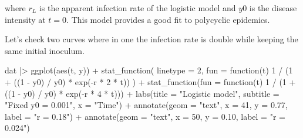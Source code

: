 \documentclass[
  letterpaper,
  DIV=11,
  numbers=noendperiod]{scrreprt}
\newenvironment{Shaded}{\begin{snugshade}}{\end{snugshade}}
\newcommand{\AttributeTok}[1]{\textcolor[rgb]{0.40,0.45,0.13}{#1}}
\newcommand{\ControlFlowTok}[1]{\textcolor[rgb]{0.00,0.23,0.31}{#1}}
\newcommand{\DecValTok}[1]{\textcolor[rgb]{0.68,0.00,0.00}{#1}}
\newcommand{\FloatTok}[1]{\textcolor[rgb]{0.68,0.00,0.00}{#1}}
\newcommand{\FunctionTok}[1]{\textcolor[rgb]{0.28,0.35,0.67}{#1}}
\newcommand{\NormalTok}[1]{\textcolor[rgb]{0.00,0.23,0.31}{#1}}
\newcommand{\SpecialCharTok}[1]{\textcolor[rgb]{0.37,0.37,0.37}{#1}}
\newcommand{\StringTok}[1]{\textcolor[rgb]{0.13,0.47,0.30}{#1}}
\begin{document}
where \(r_L\) is the apparent infection rate of the logistic model and
\(y0\) is the disease intensity at \(t=0\). This model provides a good
fit to polycyclic epidemics.

Let's check two curves where in one the infection rate is double while
keeping the same initial inoculum.

\begin{Shaded}
\begin{Highlighting}[]
\NormalTok{dat }\SpecialCharTok{|\textgreater{}}
  \FunctionTok{ggplot}\NormalTok{(}\FunctionTok{aes}\NormalTok{(t, y)) }\SpecialCharTok{+}
  \FunctionTok{stat\_function}\NormalTok{(}
    \AttributeTok{linetype =} \DecValTok{2}\NormalTok{,}
    \AttributeTok{fun =} \ControlFlowTok{function}\NormalTok{(t) }\DecValTok{1} \SpecialCharTok{/}\NormalTok{ (}\DecValTok{1} \SpecialCharTok{+}\NormalTok{ ((}\DecValTok{1} \SpecialCharTok{{-}}\NormalTok{ y0) }\SpecialCharTok{/}\NormalTok{ y0) }\SpecialCharTok{*} \FunctionTok{exp}\NormalTok{(}\SpecialCharTok{{-}}\NormalTok{r }\SpecialCharTok{*} \DecValTok{2} \SpecialCharTok{*}\NormalTok{ t))}
\NormalTok{  ) }\SpecialCharTok{+}
  \FunctionTok{stat\_function}\NormalTok{(}\AttributeTok{fun =} \ControlFlowTok{function}\NormalTok{(t) }\DecValTok{1} \SpecialCharTok{/}\NormalTok{ (}\DecValTok{1} \SpecialCharTok{+}\NormalTok{ ((}\DecValTok{1} \SpecialCharTok{{-}}\NormalTok{ y0) }\SpecialCharTok{/}\NormalTok{ y0) }\SpecialCharTok{*} \FunctionTok{exp}\NormalTok{(}\SpecialCharTok{{-}}\NormalTok{r }\SpecialCharTok{*} \DecValTok{4} \SpecialCharTok{*}\NormalTok{ t))) }\SpecialCharTok{+}
  \FunctionTok{labs}\NormalTok{(}\AttributeTok{title =} \StringTok{"Logistic model"}\NormalTok{, }\AttributeTok{subtitle =} \StringTok{"Fixed y0 = 0.001"}\NormalTok{, }\AttributeTok{x =} \StringTok{"Time"}\NormalTok{) }\SpecialCharTok{+}
  \FunctionTok{annotate}\NormalTok{(}\AttributeTok{geom =} \StringTok{"text"}\NormalTok{, }\AttributeTok{x =} \DecValTok{41}\NormalTok{, }\AttributeTok{y =} \FloatTok{0.77}\NormalTok{, }\AttributeTok{label =} \StringTok{"r = 0.18"}\NormalTok{) }\SpecialCharTok{+}
  \FunctionTok{annotate}\NormalTok{(}\AttributeTok{geom =} \StringTok{"text"}\NormalTok{, }\AttributeTok{x =} \DecValTok{50}\NormalTok{, }\AttributeTok{y =} \FloatTok{0.10}\NormalTok{, }\AttributeTok{label =} \StringTok{"r = 0.024"}\NormalTok{)}
\end{Highlighting}
\end{Shaded}
\end{document}
